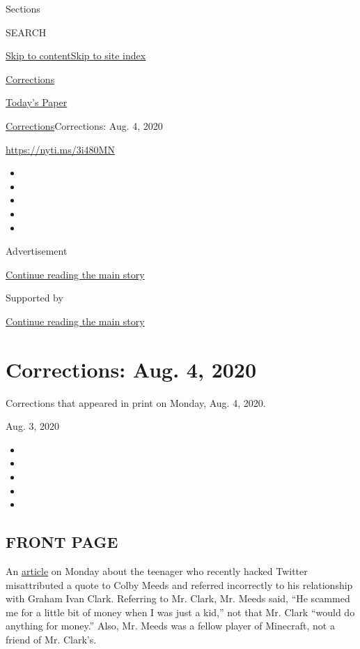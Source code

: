Sections

SEARCH

\protect\hyperlink{site-content}{Skip to
content}\protect\hyperlink{site-index}{Skip to site index}

\href{https://www.nytimes.com/section/corrections}{Corrections}

\href{https://myaccount.nytimes.com/auth/login?response_type=cookie\&client_id=vi}{}

\href{https://www.nytimes.com/section/todayspaper}{Today's Paper}

\href{/section/corrections}{Corrections}\textbar{}Corrections: Aug. 4,
2020

\url{https://nyti.ms/3i480MN}

\begin{itemize}
\item
\item
\item
\item
\item
\end{itemize}

Advertisement

\protect\hyperlink{after-top}{Continue reading the main story}

Supported by

\protect\hyperlink{after-sponsor}{Continue reading the main story}

\hypertarget{corrections-aug-4-2020}{%
\section{Corrections: Aug. 4, 2020}\label{corrections-aug-4-2020}}

Corrections that appeared in print on Monday, Aug. 4, 2020.

Aug. 3, 2020

\begin{itemize}
\item
\item
\item
\item
\item
\end{itemize}

\hypertarget{front-page}{%
\subsection{FRONT PAGE}\label{front-page}}

An
\href{https://www.nytimes.com/2020/08/02/technology/florida-teenager-twitter-hack.html}{article}
on Monday about the teenager who recently hacked Twitter misattributed a
quote to Colby Meeds and referred incorrectly to his relationship with
Graham Ivan Clark. Referring to Mr. Clark, Mr. Meeds said, ``He scammed
me for a little bit of money when I was just a kid,'' not that Mr. Clark
``would do anything for money.'' Also, Mr. Meeds was a fellow player of
Minecraft, not a friend of Mr. Clark's.

